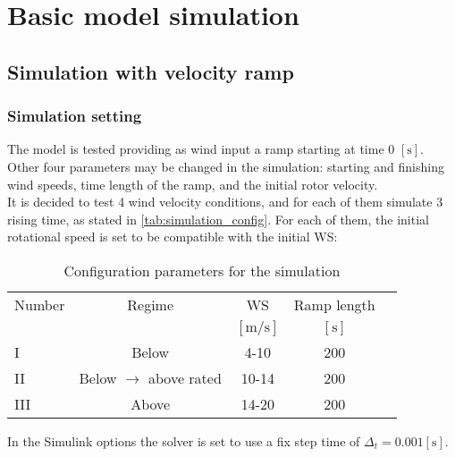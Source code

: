 \newpage
\section{Basic model simulation}\label{sec:c_basic_model_simulation}

\subsection{Simulation with velocity ramp}
\subsubsection{Simulation setting}
The model is tested providing as wind input a ramp starting at time 0 $\left[\si{\second}\right]$. Other four parameters may be changed in the simulation: starting and finishing wind speeds, time length of the ramp, and the initial rotor velocity.\\
It is decided to test 4 wind velocity conditions, and for each of them simulate 3 rising time, as stated in \autoref{tab:simulation_config}. For each of them, the initial rotational speed is set to be compatible with the initial \acrshort{WS}:

\begin{table}[htb]
    \caption{Configuration parameters for the simulation}
    \centering
    \begin{tabular}{lcccc}
    \toprule
      Number & Regime  & WS & Ramp length \\ 
       & & $\left[\si{\meter\per\second}\right]$ & $\left[\si{\second}\right]$ \\ \midrule       
       I & Below & 4-10 & 200  \\
       II & Below $\rightarrow$ above rated & 10-14 & 200 \\
       III & Above & 14-20 & 200  \\
       \bottomrule
    \end{tabular}
    \label{tab:simulation_config}
\end{table}

In the Simulink options the solver is set to use a fix step time of $\Delta_t=0.001 \left[\si{\second}\right]$.

